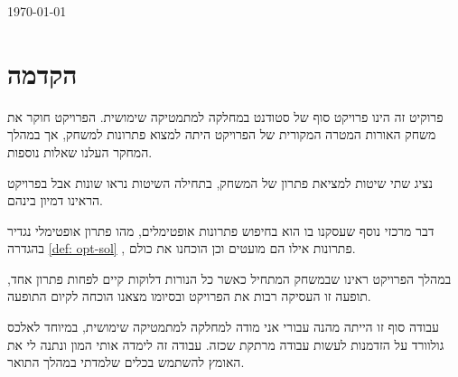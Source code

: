 \documentclass[12pt,leqno]{article}
\theoremstyle{theoremdd}
\begin{document}
\begin{titlepage}

{\large \today} \\[2cm] %


\vfill %

\end{titlepage}
\tableofcontents

\newpage
\section{הקדמה}
פרוקיט זה הינו פרויקט סוף של סטודנט במחלקה למתמטיקה שימושית.
הפרויקט 
חוקר את משחק האורות 
המטרה המקורית של הפרויקט היתה למצוא פתרונות למשחק, אך במהלך המחקר
העלנו שאלות נוספות.

נציג שתי שיטות למציאת פתרון של המשחק,
בתחילה השיטות נראו שונות אבל בפרויקט הראינו דמיון בינהם.

דבר מרכזי נוסף שעסקנו בו הוא בחיפוש פתרונות אופטימלים,
 מהו פתרון אופטימלי נגדיר בהגדרה
 \ref{def: opt-sol}
 , פתרונות אילו הם מועטים וכן הוכחנו את כולם.

במהלך הפרויקט ראינו שבמשחק המתחיל כאשר כל הנורות דלוקות קיים לפחות פתרון אחד,
תופעה זו העסיקה רבות את הפרויקט ובסיומו מצאנו הוכחה
לקיום התופעה.

עבודה סוף זו הייתה מהנה עבורי אני מודה למחלקה
למתמטיקה שימושית,
במיוחד לאלכס גולוורד על הזדמנות לעשות 
עבודה מרתקת שכזה.
עבודה זה לימדה אותי המון ונתנה לי את האומץ להשתמש בכלים שלמדתי במהלך התואר.
\newpage
\end{document}
